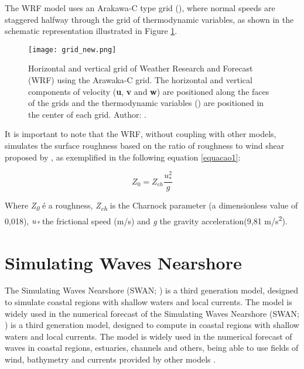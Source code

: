 \noindent The WRF model uses an Arakawa-C type grid (\cite{Arakawa1977}), where normal speeds are staggered halfway through the grid of thermodynamic variables, as shown in the 
schematic representation illustrated in Figure \textcolor{bleu_cite}{\ref{gradeswrf}}.
\bigskip

\begin{figure}[H]
    \centering
    \texttt{[image: grid\_new.png]}
    \caption{Horizontal and vertical grid of Weather Research and Forecast (WRF) using the Arawaka-C grid. The horizontal and vertical components
                        of velocity (\textbf{u}, \textbf{v} and \textbf{w}) are positioned along the faces of the grids and the thermodynamic variables
                        (\straighttheta) are positioned in the center of each grid. \newline Author: \textcite{Skamarock2008}.}
    \label{gradeswrf}
\end{figure}
\bigskip

\noindent It is important to note that the WRF, without coupling with other models, simulates the surface roughness based on the ratio of roughness to wind 
shear proposed by \textcite{Charnock1955}, as exemplified in the following equation \textcolor{bleu_cite}{\ref{equacao1}}:
\bigskip

\begin{equation}
Z_{0} = Z_{ch} \frac{u_{*}^{2}}{g}
\label{equacao1}
\end{equation}

\bigskip

\noindent Where \textit{Z\textsubscript{0}} é a roughness, \textit{Z\textsubscript{ch}} is the Charnock parameter (a dimensionless value of 0,018), \textit{u\textsubscript{*}} 
the frictional speed (m/s) and \textit{g} the gravity acceleration(9,81 m/s\textsuperscript{2}).
\bigskip



\section{Simulating Waves Nearshore}\label{swansecao}
\bigskip

\noindent The Simulating Waves Nearshore (SWAN; \cite{Booij1999, Booij1996}) is a third generation model,
designed to simulate coastal regions with shallow waters and local currents. The model is widely used in the numerical forecast of the Simulating Waves Nearshore (SWAN; \cite{Booij1999, Booij1996}) is a third generation model,
designed to compute in coastal regions with shallow waters and local currents. The model is widely used in the numerical forecast of waves in coastal regions, estuaries,  channels and 
others, being able to use fields of wind, bathymetry and currents provided by other models \parencite{Booij1999, Booij1996}.
\bigskip

